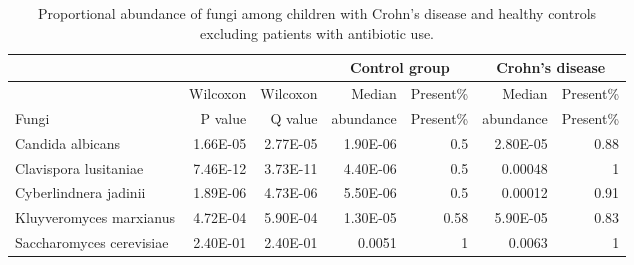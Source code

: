 \newpage
{\footnotesize
	\renewcommand{\arraystretch}{0.7} \setlength{\tabcolsep}{3pt}
	\begin{longtable}{ | l | r | r | r | r | r | r  | }
		\caption[Proportional abundance of fungi among children with Crohn’s disease and healthy controls excluding patients with antibiotic use]{Proportional abundance of fungi among children with Crohn’s disease and healthy controls excluding patients with antibiotic use.} 
		\label{TS11} \\
		
		\hline
		\multicolumn{3}{|c|}{} & \multicolumn{2}{c}{Control group}
		& \multicolumn{2}{|c|}{Crohn's disease}\\
		\hline 
		 & Wilcoxon & Wilcoxon & Median  & Present\% & Median  & Present\% \\ 
		Fungi &  P value & Q value &  abundance & Present\% &  abundance & Present\% \\ 
		\hline 
		\endfirsthead
		
		
		\endfoot
		
		\hline 
		\endlastfoot
		
		
		
		Candida albicans  &  1.66E-05  &  2.77E-05  &  1.90E-06  &  0.5  &  2.80E-05  &  0.88 \\ 
		Clavispora lusitaniae  &  7.46E-12  &  3.73E-11  &  4.40E-06  &  0.5  &  0.00048  &  1 \\ 
		Cyberlindnera jadinii  &  1.89E-06  &  4.73E-06  &  5.50E-06  &  0.5  &  0.00012  &  0.91 \\ 
		Kluyveromyces marxianus  &  4.72E-04  &  5.90E-04  &  1.30E-05  &  0.58  &  5.90E-05  &  0.83 \\ 
		Saccharomyces cerevisiae  &  2.40E-01  &  2.40E-01  &  0.0051  &  1  &  0.0063  &  1
		
	\end{longtable}
}





